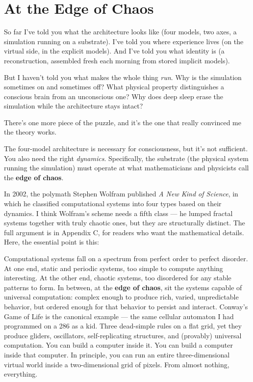 \documentclass[11pt, twoside, openright]{book}
\begin{document}
\chapter{At the Edge of Chaos}

So far I've told you what the architecture looks like (four models, two axes, a simulation running on a substrate). I've told you where experience lives (on the virtual side, in the explicit models). And I've told you what identity is (a reconstruction, assembled fresh each morning from stored implicit models).

But I haven't told you what makes the whole thing \textit{run}. Why is the simulation sometimes on and sometimes off? What physical property distinguishes a conscious brain from an unconscious one? Why does deep sleep erase the simulation while the architecture stays intact?

There's one more piece of the puzzle, and it's the one that really convinced me the theory works.

The four-model architecture is necessary for consciousness, but it's not sufficient. You also need the right \textit{dynamics}. Specifically, the substrate (the physical system running the simulation) must operate at what mathematicians and physicists call the \textbf{edge of chaos}.

In 2002, the polymath Stephen Wolfram published \textit{A New Kind of Science}, in which he classified computational systems into four types based on their dynamics. I think Wolfram's scheme needs a fifth class --- he lumped fractal systems together with truly chaotic ones, but they are structurally distinct. The full argument is in Appendix C, for readers who want the mathematical details. Here, the essential point is this:

Computational systems fall on a spectrum from perfect order to perfect disorder. At one end, static and periodic systems, too simple to compute anything interesting. At the other end, chaotic systems, too disordered for any stable patterns to form. In between, at the \textbf{edge of chaos}, sit the systems capable of universal computation: complex enough to produce rich, varied, unpredictable behavior, but ordered enough for that behavior to persist and interact. Conway's Game of Life is the canonical example --- the same cellular automaton I had programmed on a 286 as a kid. Three dead-simple rules on a flat grid, yet they produce gliders, oscillators, self-replicating structures, and (provably) universal computation. You can build a computer inside it. You can build a computer inside that computer. In principle, you can run an entire three-dimensional virtual world inside a two-dimensional grid of pixels. From almost nothing, everything.
\end{document}
